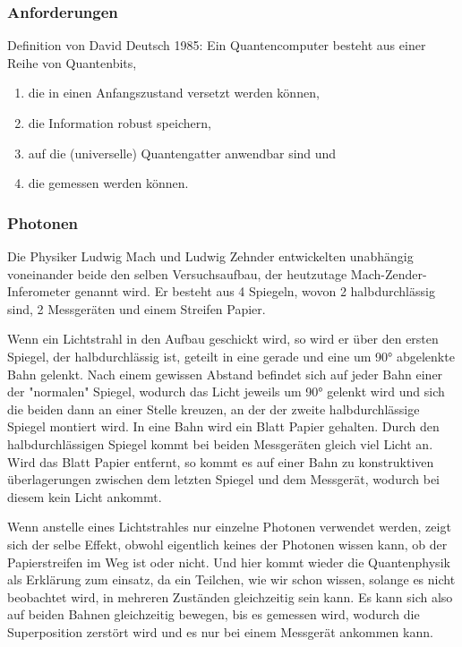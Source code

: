 \subsubsection{Anforderungen}
\label{sec:anforderungen}

Definition von David Deutsch 1985:
Ein Quantencomputer besteht aus einer Reihe von Quantenbits,
\begin{enumerate}
	\item die in einen Anfangszustand versetzt werden können,
	\item die Information robust speichern,
	\item auf die (universelle) Quantengatter anwendbar sind und
	\item die gemessen werden können.
\end{enumerate}

\subsubsection{Photonen}
\label{sec:photonen}

Die Physiker Ludwig Mach und Ludwig Zehnder entwickelten unabhängig voneinander beide den selben Versuchsaufbau, der heutzutage Mach-Zender-Inferometer genannt wird. Er besteht aus 4 Spiegeln, wovon 2 halbdurchlässig sind, 2 Messgeräten und einem Streifen Papier.

Wenn ein Lichtstrahl in den Aufbau geschickt wird, so wird er über den ersten Spiegel, der halbdurchlässig ist, geteilt in eine gerade und eine um 90° abgelenkte Bahn gelenkt. Nach einem gewissen Abstand befindet sich auf jeder Bahn einer der "normalen" Spiegel, wodurch das Licht jeweils um 90° gelenkt wird und sich die beiden dann an einer Stelle kreuzen, an der der zweite halbdurchlässige Spiegel montiert wird. In eine Bahn wird ein Blatt Papier gehalten. Durch den halbdurchlässigen Spiegel kommt bei beiden Messgeräten gleich viel Licht an. Wird das Blatt Papier entfernt, so kommt es auf einer Bahn zu konstruktiven überlagerungen zwischen dem letzten Spiegel und dem Messgerät, wodurch bei diesem kein Licht ankommt.

Wenn anstelle eines Lichtstrahles nur einzelne Photonen verwendet werden, zeigt sich der selbe Effekt, obwohl eigentlich keines der Photonen wissen kann, ob der Papierstreifen im Weg ist oder nicht. Und hier kommt wieder die Quantenphysik als Erklärung zum einsatz, da ein Teilchen, wie wir schon wissen, solange es nicht beobachtet wird, in mehreren Zuständen gleichzeitig sein kann. Es kann sich also auf beiden Bahnen gleichzeitig bewegen, bis es gemessen wird, wodurch die Superposition zerstört wird und es nur bei einem Messgerät ankommen kann.

